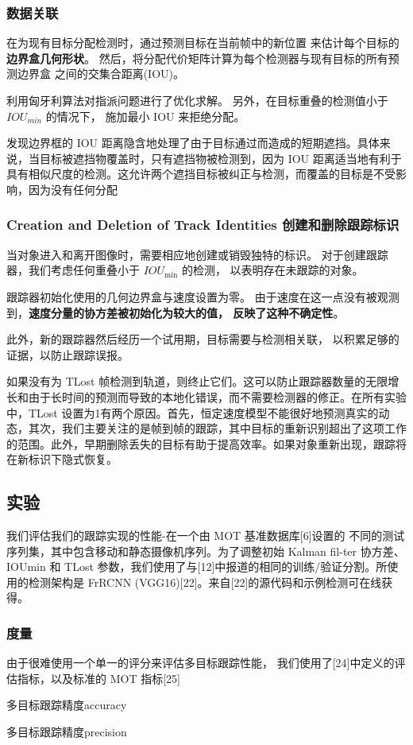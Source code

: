 \documentclass{article}
\begin{document}
\subsubsection{数据关联}
在为现有目标分配检测时，通过预测目标在当前帧中的新位置
来估计每个目标的\textbf{边界盒几何形状}。
然后，将分配代价矩阵计算为每个检测器与现有目标的所有预测边界盒
之间的交集合距离(IOU)。

利用匈牙利算法对指派问题进行了优化求解。
另外，在目标重叠的检测值小于 $IOU_{min}$ 的情况下，
施加最小 IOU 来拒绝分配。

发现边界框的 IOU 距离隐含地处理了由于目标通过而造成的短期遮挡。具体来说，当目标被遮挡物覆盖时，只有遮挡物被检测到，因为 IOU 距离适当地有利于具有相似尺度的检测。这允许两个遮挡目标被纠正与检测，而覆盖的目标是不受影响，因为没有任何分配
\subsubsection{Creation and Deletion of Track Identities 创建和删除跟踪标识}
当对象进入和离开图像时，需要相应地创建或销毁独特的标识。
对于创建跟踪器，我们考虑任何重叠小于 $IOU_{\min}$ 的检测，
以表明存在未跟踪的对象。

跟踪器初始化使用的几何边界盒与速度设置为零。
由于速度在这一点没有被观测到，\textbf{速度分量的协方差被初始化为较大的值，
反映了这种不确定性}。

此外，新的跟踪器然后经历一个试用期，目标需要与检测相关联，
以积累足够的证据，以防止跟踪误报。

如果没有为 TLost 帧检测到轨道，则终止它们。这可以防止跟踪器数量的无限增长和由于长时间的预测而导致的本地化错误，而不需要检测器的修正。在所有实验中，TLost 设置为1有两个原因。首先，恒定速度模型不能很好地预测真实的动态，其次，我们主要关注的是帧到帧的跟踪，其中目标的重新识别超出了这项工作的范围。此外，早期删除丢失的目标有助于提高效率。如果对象重新出现，跟踪将在新标识下隐式恢复。

\subsection{实验}
我们评估我们的跟踪实现的性能-在一个由 MOT 基准数据库[6]设置的
不同的测试序列集，其中包含移动和静态摄像机序列。为了调整初始 Kalman fil-ter 协方差、 IOUmin 和 TLost 参数，我们使用了与[12]中报道的相同的训练/验证分割。所使用的检测架构是 FrRCNN (VGG16)[22]。来自[22]的源代码和示例检测可在线获得。

\subsubsection{度量}
由于很难使用一个单一的评分来评估多目标跟踪性能，
我们使用了[24]中定义的评估指标，以及标准的 MOT 指标[25]
\begin{description}[leftmargin=2.7cm,style=nextline,nosep]%
    \item[MOTA(up)] 多目标跟踪精度accuracy
    \item[MOTP(up)] 多目标跟踪精度precision
\end{description}
\end{document}
